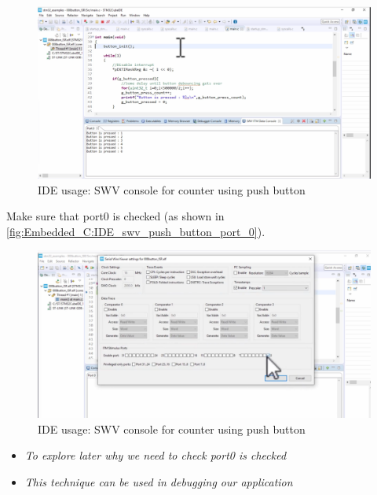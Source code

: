 \begin{figure}[h]
\centering
\includegraphics[scale=0.55]{Figures/Embedded_C/IDE_swv_push_button}
\caption{IDE usage: SWV console for counter using push button}
\label{fig:Embedded_C:IDE_swv_push_button}
\end{figure}

Make sure that port0 is checked (as shown in \autoref{fig:Embedded_C:IDE_swv_push_button_port_0}).

\begin{figure}[h]
\centering
\includegraphics[scale=0.55]{Figures/Embedded_C/IDE_swv_push_button_port_0}
\caption{IDE usage: SWV console for counter using push button}
\label{fig:Embedded_C:IDE_swv_push_button_port_0}
\end{figure}




\begin{itemize}
    
    \item \textit{To explore later why we need to check port0 is checked}
    
    \item \textit{This technique can be used in debugging our application}
    
\end{itemize}


